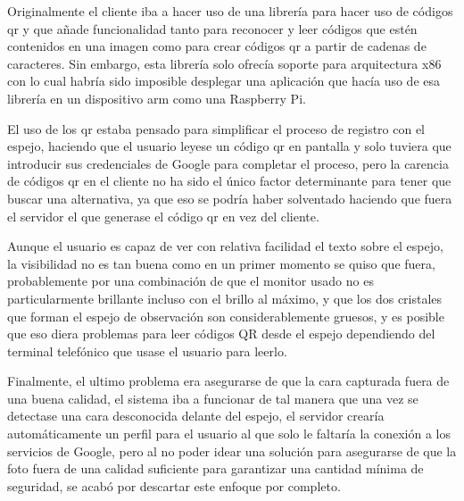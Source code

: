 Originalmente el cliente iba a hacer uso de una librería para hacer uso de códigos \acrshort{qr} y que añade funcionalidad tanto para reconocer y leer códigos que estén contenidos en una imagen como para crear códigos \acrshort{qr} a partir de cadenas de caracteres.
Sin embargo, esta librería solo ofrecía soporte para arquitectura x86 con lo cual habría sido imposible desplegar una aplicación que hacía uso de esa librería en un dispositivo \acrshort{arm} como una Raspberry Pi.

El uso de los \acrshort{qr} estaba pensado para simplificar el proceso de registro con el espejo, haciendo que el usuario leyese un código \acrshort{qr} en pantalla y solo tuviera que introducir sus credenciales de Google para completar el proceso, pero la carencia de códigos \acrshort{qr} en el cliente no ha sido el único factor determinante para tener que buscar una alternativa, ya que eso se podría haber solventado haciendo que fuera el servidor el que generase el código \acrshort{qr} en vez del cliente.

Aunque el usuario es capaz de ver con relativa facilidad el texto sobre el espejo, la visibilidad no es tan buena como en un primer momento se quiso que fuera, probablemente por una combinación de que el monitor usado no es particularmente brillante incluso con el brillo al máximo, y que los dos cristales que forman el espejo de observación son considerablemente gruesos, y es posible que eso diera problemas para leer códigos QR desde el espejo dependiendo del terminal telefónico que usase el usuario para leerlo.

Finalmente, el ultimo problema era asegurarse de que la cara capturada fuera de una buena calidad, el sistema iba a funcionar de tal manera que una vez se detectase una cara desconocida delante del espejo, el servidor crearía automáticamente un perfil para el usuario al que solo le faltaría la conexión a los servicios de Google, pero al no poder idear una solución para asegurarse de que la foto fuera de una calidad suficiente para garantizar una cantidad mínima de seguridad, se acabó por descartar este enfoque por completo.
